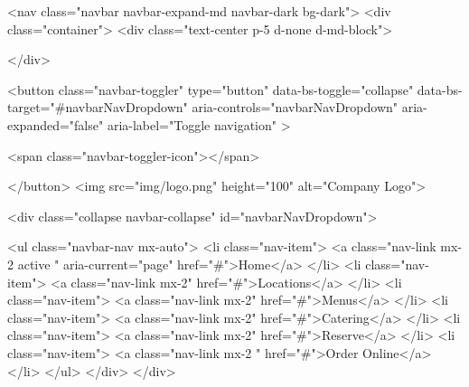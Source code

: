 
    <nav class="navbar navbar-expand-md navbar-dark bg-dark">
        <div class="container">
            <div class="text-center p-5 d-none d-md-block">
             
              </div>
          
          
        <button 
             class="navbar-toggler"
             type="button"
             data-bs-toggle="collapse"
             data-bs-target="#navbarNavDropdown" 
             aria-controls="navbarNavDropdown" 
             aria-expanded="false" 
             aria-label="Toggle navigation"
        >
                
                    
       
                <span class="navbar-toggler-icon"></span>
              
          </button>
          <img src="img/logo.png" height="100" alt="Company Logo">

          
          <div class="collapse navbar-collapse" id="navbarNavDropdown">
            
            <ul class="navbar-nav mx-auto">
              <li class="nav-item">
                <a class="nav-link mx-2 active " aria-current="page" href="#">Home</a>
              </li>
              <li class="nav-item">
                <a class="nav-link mx-2" href="#">Locations</a>
              </li>
              <li class="nav-item">
                <a class="nav-link mx-2" href="#">Menus</a>
              </li>
              <li class="nav-item">
                <a class="nav-link mx-2" href="#">Catering</a>
              </li>
              <li class="nav-item">
                <a class="nav-link mx-2" href="#">Reserve</a>
              </li>
              <li class="nav-item">
                <a class="nav-link mx-2 " href="#">Order Online</a>
              </li>
            </ul>
          </div>
        </div>